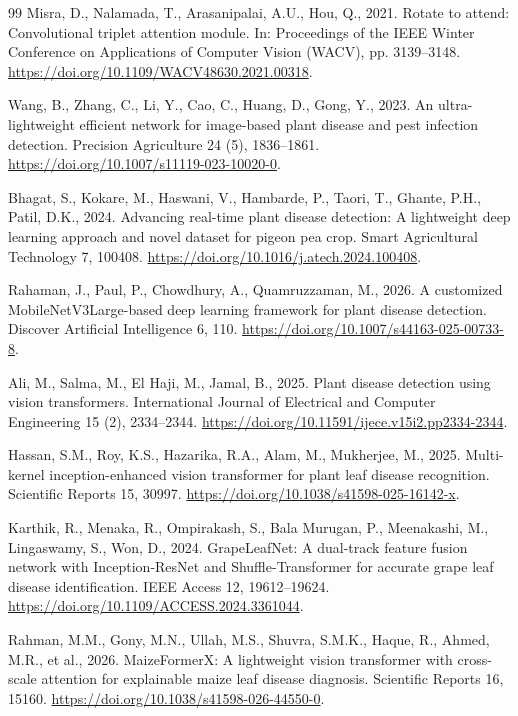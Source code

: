 \begin{thebibliography}{99}
Misra, D., Nalamada, T., Arasanipalai, A.U., Hou, Q., 2021. Rotate to attend: Convolutional triplet attention module. In: Proceedings of the IEEE Winter Conference on Applications of Computer Vision (WACV), pp. 3139--3148. \url{https://doi.org/10.1109/WACV48630.2021.00318}.

Wang, B., Zhang, C., Li, Y., Cao, C., Huang, D., Gong, Y., 2023. An ultra-lightweight efficient network for image-based plant disease and pest infection detection. Precision Agriculture 24 (5), 1836--1861. \url{https://doi.org/10.1007/s11119-023-10020-0}.

Bhagat, S., Kokare, M., Haswani, V., Hambarde, P., Taori, T., Ghante, P.H., Patil, D.K., 2024. Advancing real-time plant disease detection: A lightweight deep learning approach and novel dataset for pigeon pea crop. Smart Agricultural Technology 7, 100408. \url{https://doi.org/10.1016/j.atech.2024.100408}.

Rahaman, J., Paul, P., Chowdhury, A., Quamruzzaman, M., 2026. A customized MobileNetV3Large-based deep learning framework for plant disease detection. Discover Artificial Intelligence 6, 110. \url{https://doi.org/10.1007/s44163-025-00733-8}.

Ali, M., Salma, M., El Haji, M., Jamal, B., 2025. Plant disease detection using vision transformers. International Journal of Electrical and Computer Engineering 15 (2), 2334--2344. \url{https://doi.org/10.11591/ijece.v15i2.pp2334-2344}.

Hassan, S.M., Roy, K.S., Hazarika, R.A., Alam, M., Mukherjee, M., 2025. Multi-kernel inception-enhanced vision transformer for plant leaf disease recognition. Scientific Reports 15, 30997. \url{https://doi.org/10.1038/s41598-025-16142-x}.

Karthik, R., Menaka, R., Ompirakash, S., Bala Murugan, P., Meenakashi, M., Lingaswamy, S., Won, D., 2024. GrapeLeafNet: A dual-track feature fusion network with Inception-ResNet and Shuffle-Transformer for accurate grape leaf disease identification. IEEE Access 12, 19612--19624. \url{https://doi.org/10.1109/ACCESS.2024.3361044}.

Rahman, M.M., Gony, M.N., Ullah, M.S., Shuvra, S.M.K., Haque, R., Ahmed, M.R., et al., 2026. MaizeFormerX: A lightweight vision transformer with cross-scale attention for explainable maize leaf disease diagnosis. Scientific Reports 16, 15160. \url{https://doi.org/10.1038/s41598-026-44550-0}.


\end{thebibliography}
